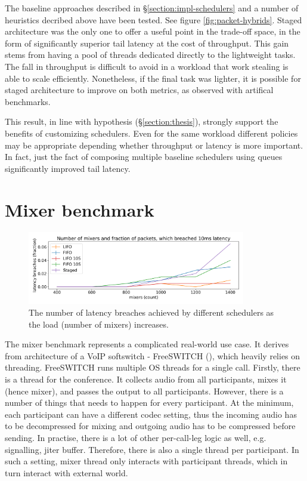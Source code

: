 \documentclass[12pt,a4paper,twoside]{report}
\begin{document}
The baseline approaches described in \S\ref{section:impl-schedulers} and a number of heuristics decribed above have been tested. See figure \ref{fig:packet-hybrids}. Staged architecture was the only one to offer a useful point in the trade-off space, in the form of significantly superior tail latency at the cost of throughput. This gain stems from having a pool of threads dedicated directly to the lightweight tasks. The fall in throughput is difficult to avoid in a workload that work stealing is able to scale efficiently. Nonetheless, if the final task was lighter, it is possible for staged architecture to improve on both metrics, as observed with artifical benchmarks. 

This result, in line with hypothesis (\S\ref{section:thesis}), strongly support the benefits of customizing schedulers. Even for the same workload different policies may be appropriate depending whether throughput or latency is more important. In fact, just the fact of composing multiple baseline schedulers using queues significantly improved tail latency.

\section{Mixer benchmark}
\label{section:mixer-benchmark}

\begin{figure} 
    \centering 
    \includegraphics[width=0.85\textwidth]{eval/mixer-base8.png}
    \caption{The number of latency breaches achieved by different schedulers as the load (number of mixers) increases.}
   \label{fig:mixer-bench}
\end{figure}

The mixer benchmark represents a complicated real-world use case. It derives from architecture of a VoIP softswitch - FreeSWITCH (\cite{Maruzzelli2017-ou}), which heavily relies on threading. FreeSWITCH runs multiple OS threads for a single call. Firstly, there is a thread for the conference. It collects audio from all participants, mixes it (hence mixer), and passes the output to all participants. However, there is a number of things that needs to happen for every participant. At the minimum, each participant can have a different codec setting, thus the incoming audio has to be decompressed for mixing and outgoing audio has to be compressed before sending. In practise, there is a lot of other per-call-leg logic as well, e.g. signalling, jiter buffer. Therefore, there is also a single thread per participant. In such a setting, mixer thread only interacts with participant threads, which in turn interact with external world. 
\end{document}
